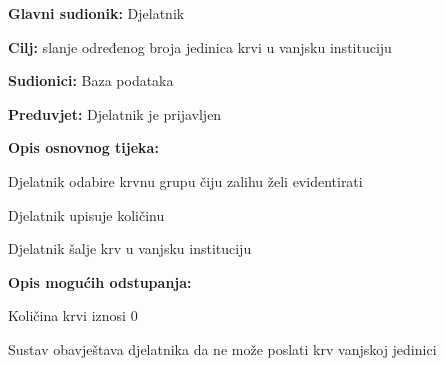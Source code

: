 \noindent {}
					\begin{packed_item}
	
						\item \textbf{Glavni sudionik: }Djelatnik
						\item \textbf{Cilj:} slanje određenog broja jedinica krvi u vanjsku instituciju
						\item \textbf{Sudionici:} Baza podataka
						\item \textbf{Preduvjet:} Djelatnik je prijavljen
						\item \textbf{Opis osnovnog tijeka:}
						
						\item[] \begin{packed_enum}
	
							\item Djelatnik odabire krvnu grupu čiju zalihu želi evidentirati
							\item Djelatnik upisuje količinu
							\item Djelatnik šalje krv u vanjsku instituciju
						\end{packed_enum}
						\item  \textbf{Opis mogućih odstupanja:}
						
						\item[] \begin{packed_item}
	
							\item[2.a] Količina krvi iznosi 0
							\item[] \begin{packed_enum}
								
								\item  Sustav obavještava djelatnika da ne može poslati krv vanjskoj jedinici

								
							\end{packed_enum}
					\end{packed_item}
					\end{packed_item}

